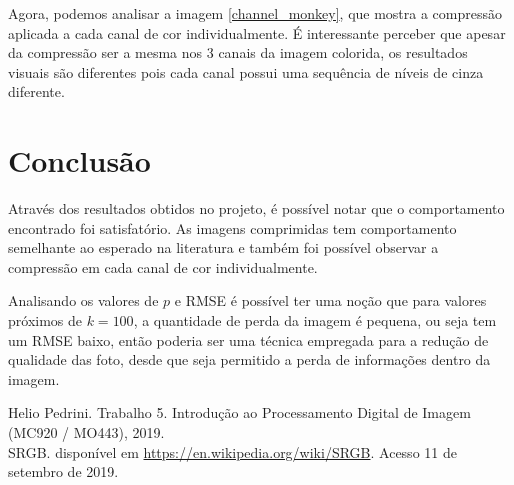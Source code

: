 \documentclass[conference]{IEEEtran}
\begin{document}
    Agora, podemos analisar a imagem \ref{channel_monkey}, que mostra a compressão aplicada a cada canal de cor individualmente. É interessante perceber que apesar da compressão ser a mesma nos 3 canais da imagem colorida, os resultados visuais são diferentes pois cada canal possui uma sequência de níveis de cinza diferente.


\section{Conclusão}

    Através dos resultados obtidos no projeto, é possível notar que o comportamento encontrado foi satisfatório.
    As imagens comprimidas tem comportamento semelhante ao esperado na literatura e também foi possível observar a compressão em cada canal de cor individualmente.

    Analisando os valores de $p$ e RMSE é possível ter uma noção que para valores próximos de $k = 100$, a quantidade de perda da imagem é pequena, ou seja tem um RMSE baixo, então poderia ser uma técnica empregada para a redução de qualidade das foto, desde que seja permitido a perda de informações dentro da imagem.

\begin{thebibliography}{00}

   Helio Pedrini. Trabalho 5. Introdução ao Processamento Digital de Imagem (MC920 / MO443), 2019.\\

   SRGB. disponível em \url{https://en.wikipedia.org/wiki/SRGB}. Acesso 11 de setembro de 2019.

\end{thebibliography}
\end{document}
